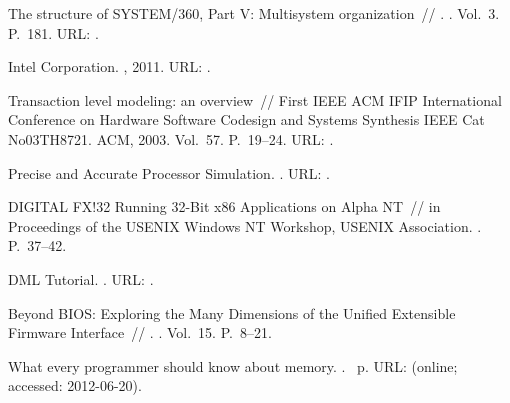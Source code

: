 \begin{thebibliography}{10}
 {The structure of {SYSTEM/360}, {Part V}: Multisystem
  organization}~// . \BibDash
{}. \BibDash
\newblock Vol.~3. \BibDash
\newblock P.~181. \BibDash
\newblock URL: .

Intel Cor\-po\-ra\-tion. \BibDash
{}, 2011. \BibDash
\newblock URL: .

 {Transaction level modeling: an overview}~// {First
  IEEE ACM IFIP International Conference on Hardware Software Codesign and
  Systems Synthesis IEEE Cat No03TH8721}. \BibDash
\newblock ACM, 2003. \BibDash
\newblock Vol.~57. \BibDash
\newblock P.~19–24. \BibDash
\newblock URL:
  .

 {Precise and Accurate Processor Simulation}. \BibDash
{}. \BibDash
\newblock URL:
  .

 {{DIGITAL FX!32} Running 32-Bit x86
  Applications on {Alpha} {NT}}~// {in Proceedings of the USENIX Windows NT
  Workshop, USENIX Association}. \BibDash
{}. \BibDash
\newblock P.~37–42.

{{DML} Tutorial}. \BibDash
{}. \BibDash
\newblock URL: .

 Beyond {BIOS}: Exploring the Many
  Dimensions of the Unified Extensible Firmware Interface~// . \BibDash
{}. \BibDash
\newblock Vol.~15. \BibDash
\newblock P.~8--21.

 {What every programmer should know about memory}. \BibDash
{}. \BibDash
{}~p. \BibDash
\newblock URL:  (online;
  accessed: 2012-06-20).


\end{thebibliography}

